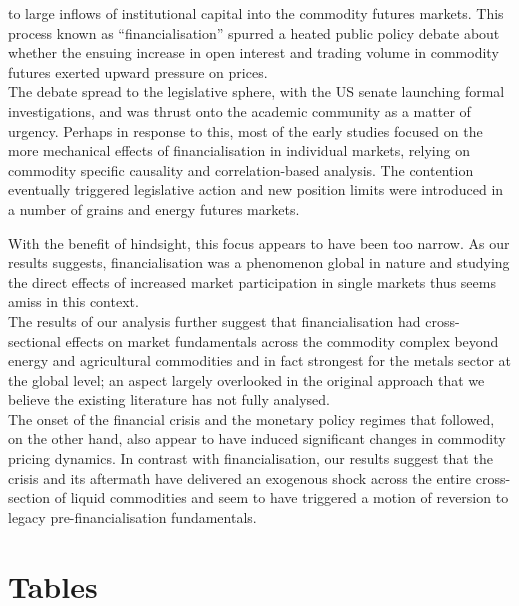 \documentclass[
  authoryear,
  preprint,
  3p]{elsarticle}
\begin{document}
to large inflows of institutional capital into the commodity futures
markets. This process known as ``financialisation'' spurred a heated
public policy debate about whether the ensuing increase in open interest
and trading volume in commodity futures exerted upward pressure on
prices.\\
The debate spread to the legislative sphere, with the US senate
launching formal investigations, and was thrust onto the academic
community as a matter of urgency. Perhaps in response to this, most of
the early studies focused on the more mechanical effects of
financialisation in individual markets, relying on commodity specific
causality and correlation-based analysis. The contention eventually
triggered legislative action and new position limits were introduced in
a number of grains and energy futures markets.

\medskip

With the benefit of hindsight, this focus appears to have been too
narrow. As our results suggests, financialisation was a phenomenon
global in nature and studying the direct effects of increased market
participation in single markets thus seems amiss in this context.\\
The results of our analysis further suggest that financialisation had
cross-sectional effects on market fundamentals across the commodity
complex beyond energy and agricultural commodities and in fact strongest
for the metals sector at the global level; an aspect largely overlooked
in the original approach that we believe the existing literature has not
fully analysed.\\
The onset of the financial crisis and the monetary policy regimes that
followed, on the other hand, also appear to have induced significant
changes in commodity pricing dynamics. In contrast with
financialisation, our results suggest that the crisis and its aftermath
have delivered an exogenous shock across the entire cross-section of
liquid commodities and seem to have triggered a motion of reversion to
legacy pre-financialisation fundamentals.

\newpage

\section{Tables}\label{tables}

\begingroup\fontsize{7}{9}\selectfont
\end{document}
